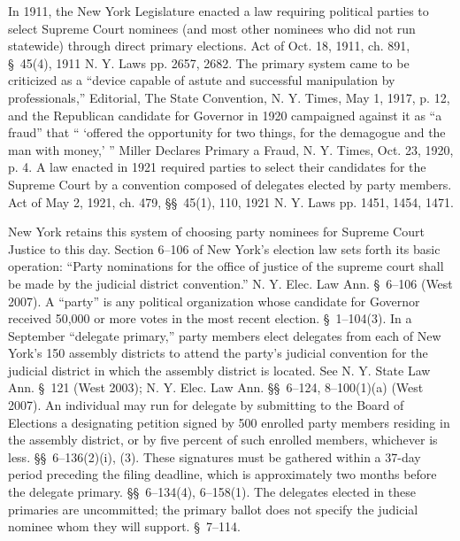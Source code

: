   In 1911, the New York Legislature enacted a law requiring political parties to select Supreme Court nominees (and most other nominees who did not run statewide) through direct primary elections. Act of Oct. 18, 1911, ch. 891, \S~45(4), 1911 N. Y. Laws pp. 2657, 2682. The primary system came to be criticized as a ``device capable of astute and successful manipulation by professionals,'' Editorial, The State Conven\newpage tion, N. Y. Times, May 1, 1917, p. 12, and the Republican candidate for Governor in 1920 campaigned against it as ``a fraud'' that `` ‘offered the opportunity for two things, for the demagogue and the man with money,' '' Miller Declares Primary a Fraud, N. Y. Times, Oct. 23, 1920, p. 4. A law enacted in 1921 required parties to select their candidates for the Supreme Court by a convention composed of delegates elected by party members. Act of May 2, 1921, ch. 479, \S\S~45(1), 110, 1921 N. Y. Laws pp. 1451, 1454, 1471.

  New York retains this system of choosing party nominees for Supreme Court Justice to this day. Section 6--106 of New York's election law sets forth its basic operation: ``Party nominations for the office of justice of the supreme court shall be made by the judicial district convention.'' N. Y. Elec. Law Ann. \S~6--106 (West 2007). A ``party'' is any political organization whose candidate for Governor received 50,000 or more votes in the most recent election. \S~1--104(3). In a September ``delegate primary,'' party members elect delegates from each of New York's 150 assembly districts to attend the party's judicial convention for the judicial district in which the assembly district is located. See N. Y. State Law Ann. \S~121 (West 2003); N. Y. Elec. Law Ann. \S\S~6--124, 8--100(1)(a) (West 2007). An individual may run for delegate by submitting to the Board of Elections a designating petition signed by 500 enrolled party members residing in the assembly district, or by five percent of such enrolled members, whichever is less. \S\S~6--136(2)(i), (3). These signatures must be gathered within a 37-day period preceding the filing deadline, which is approximately two months before the delegate primary. \S\S~6--134(4), 6--158(1). The delegates elected in these primaries are uncommitted; the primary ballot does not specify the judicial nominee whom they will support. \S~7--114.

